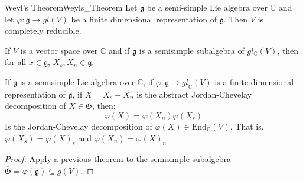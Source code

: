     \begin{ltheorem}{Weyl's Theorem}{Weyls_Theorem}
        Let $\mathfrak{g}$ be a semi-simple Lie algebra over $\mathbb{C}$
        and let $\varphi:\mathfrak{g}\rightarrow{gl}(V)$ be a finite
        dimensional representation of $\mathfrak{g}$. Then $V$ is
        completely reducible.
    \end{ltheorem}
    \begin{theorem}
        If $V$ is a vector space over $\mathbb{C}$ and if $\mathfrak{g}$ is
        a semisimple subalgebra of $gl_{\mathbb{C}}(V)$, then for all
        $x\in\mathfrak{g}$, $X_{s},X_{n}\in\mathfrak{g}$.
    \end{theorem}
    \begin{theorem}
        If $\mathfrak{g}$ is a semisimple Lie algebra over $\mathbb{C}$,
        if $\varphi:\mathfrak{g}\rightarrow{gl}_{\mathbb{C}}(V)$ is a
        finite dimensional representation of $\mathfrak{g}$, if
        $X=X_{s}+X_{n}$ is the abstract Jordan-Chevelay decomposition of
        $X\in\mathfrak{G}$, then:
        \begin{equation}
            \varphi(X)=\varphi(X_{n})\varphi(X_{s})
        \end{equation}
        Is the Jordan-Chevelay decomposition of
        $\varphi(X)\in\textrm{End}_{\mathbb{C}}(V)$. That is,
        $\varphi(X_{s})=\varphi(X)_{s}$ and $\varphi(X_{n})=\varphi(X)_{n}$.
    \end{theorem}
    \begin{proof}
        Apply a previous theorem to the semisimple subalgebra
        $\overline{\mathfrak{G}}=\varphi(\mathfrak{g})\subseteq{g}(V)$.
    \end{proof}
